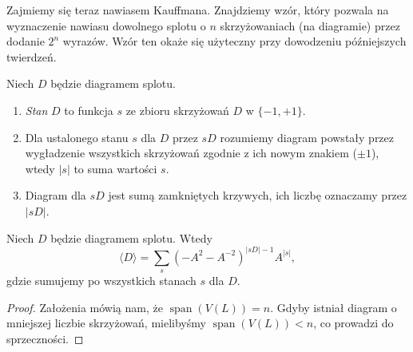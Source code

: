 Zajmiemy się teraz nawiasem Kauffmana.
Znajdziemy wzór, który pozwala na wyznaczenie nawiasu dowolnego splotu o $n$ skrzyżowaniach (na diagramie) przez dodanie $2^n$ wyrazów.
Wzór ten okaże się użyteczny przy dowodzeniu późniejszych twierdzeń.




\begin{definicja}
Niech $D$ będzie diagramem splotu.
\begin{enumerate}
\item \emph{Stan} $D$ to funkcja $s$ ze zbioru skrzyżowań $D$ w $\{-1, +1\}$.
\item Dla ustalonego stanu $s$ dla $D$ przez $sD$ rozumiemy diagram powstały przez wygładzenie wszystkich skrzyżowań zgodnie z ich nowym znakiem ($\pm 1$), wtedy $|s|$ to suma wartości $s$.
\item Diagram dla $sD$ jest sumą zamkniętych krzywych, ich liczbę oznaczamy przez $|sD|$.
\end{enumerate}
\end{definicja}

\begin{twierdzenie}
Niech $D$ będzie diagramem splotu.
Wtedy
\[\langle D\rangle = \sum_s (-A^2-A^{-2})^{|sD|-1} A^{|s|},\]
gdzie sumujemy po wszystkich stanach $s$ dla $D$.
\end{twierdzenie}

\newpage


\begin{proof}
Założenia mówią nam, że $\operatorname{span} (V(L)) = n$.
Gdyby istniał diagram o mniejszej liczbie skrzyżowań, mielibyśmy $\operatorname{span} (V(L)) < n$, co prowadzi do sprzeczności.
\end{proof}
